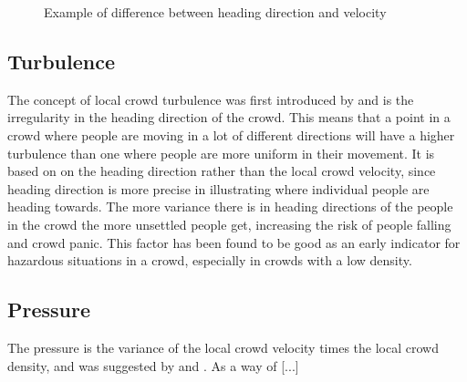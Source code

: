\begin{figure}\centering
{}
\caption{Example of difference between heading direction and velocity}
\label{fig:headingvsvelocity}
\end{figure}

\subsection{Turbulence}
\label{sub:crowdFactorTurbulence}
The concept of local crowd turbulence was first introduced by \citet{videoanalysis} and is the irregularity in the heading direction of the crowd. This means that a point in a crowd where people are moving in a lot of different directions will have a higher turbulence than one where people are more uniform in their movement. It is based on on the heading direction rather than the local crowd velocity, since heading direction is more precise in illustrating where individual people are heading towards. The more variance there is in heading directions of the people in the crowd the more unsettled people get, increasing the risk of people falling and crowd panic. This factor has been found to be good as an early indicator for hazardous situations in a crowd, especially in crowds with a low density\cite{wirz2012inferring}.


\subsection{Pressure}
The pressure is the variance of the local crowd velocity times the local crowd density, and was suggested by \citeauthor{empircalstudy} \citeyearpar{empircalstudy} \cite{empircalstudy} and \citeauthor{videoanalysis} \citeyearpar{videoanalysis} \cite{videoanalysis}. As a way of [...] 


